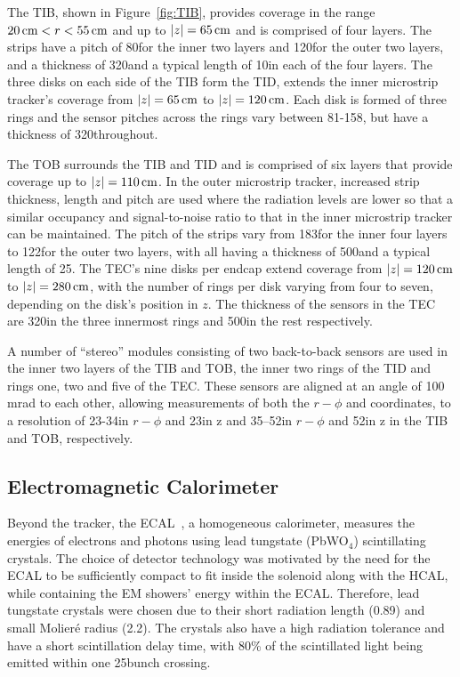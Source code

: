The TIB, shown in Figure~\ref{fig:TIB}, provides coverage in the range $20\,\text{cm} < r < 55\,\text{cm}$ and up to $|z| = 65\,\text{cm}$ and is comprised of four layers.
The strips have a pitch of 80\mum for the inner two layers and 120\mum for the outer two layers, and a thickness of 320\mum and a typical length of 10\cm in each of the four layers.
The three disks on each side of the TIB form the TID, extends the inner microstrip tracker's coverage from $|z| = 65\,\text{cm}$ to $|z| = 120\,\text{cm}$.
Each disk is formed of three rings and the sensor pitches across the rings vary between 81-158\mum, but have a thickness of 320\mum throughout.

The TOB surrounds the TIB and TID and is comprised of six layers that provide coverage up to $|z| = 110\,\text{cm}$.
In the outer microstrip tracker, increased strip thickness, length and pitch are used where the radiation levels are lower so that a similar occupancy and signal-to-noise ratio to that in the inner microstrip tracker can be maintained.
The pitch of the strips vary from 183\mum for the inner four layers to 122\mum for the outer two layers, with all having a thickness of 500\mum and a typical length of 25\cm. 
The TEC's nine disks per endcap extend coverage from $|z| = 120\,\text{cm}$ to $|z| = 280\,\text{cm}$, with the number of rings per disk varying from four to seven, depending on the disk's position in $z$.
The thickness of the sensors in the TEC are 320\mum in the three innermost rings and 500\mum in the rest respectively.

A number of ``stereo'' modules consisting of two back-to-back sensors are used in the inner two layers of the TIB and TOB, the inner two rings of the TID and rings one, two and five of the TEC.
These sensors are aligned at an angle of 100 mrad to each other, allowing measurements of both the $r-\phi$ and \rz coordinates, to a resolution of 23-34\mum in $r-\phi$ and 23\mum in z and 35–52\mum in $r-\phi$ and 52\mum in z in the TIB and TOB, respectively.

\subsection{Electromagnetic Calorimeter}\label{subsec:ECAL}
Beyond the tracker, the ECAL~\cite{CMS:1997ysd,CMS:2002xia}, a homogeneous calorimeter, measures the energies of electrons and photons using lead tungstate (PbWO$_{4}$) scintillating crystals.
The choice of detector technology was motivated by the need for the ECAL to be sufficiently compact to fit inside the solenoid along with the HCAL, while containing the EM showers' energy within the ECAL.
Therefore, lead tungstate crystals were chosen due to their short radiation length (0.89\cm) and small Molier\'{e} radius (2.2\cm).
The crystals also have a high radiation tolerance and have a short scintillation delay time, with 80\% of the scintillated light being emitted within one 25\ns bunch crossing.

